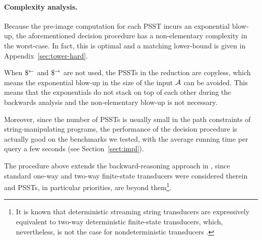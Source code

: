 \paragraph*{Complexity analysis.} Because the pre-image computation for each PSST incurs an exponential blow-up, the aforementioned decision procedure has a non-elementary complexity in the worst-case. In fact, this is optimal and a matching lower-bound is given in Appendix~\ref{sec:tower-hard}.

When $\$^{\leftarrow}$ and $\$^{\rightarrow}$ are not used, the PSSTs in the reduction are copyless, which means the exponential blow-up in the size of the input \FA{} $\mathcal{A}$ can be avoided. This means that the exponentials do not stack on top of each other during the backwards analysis and the non-elementary blow-up is not necessary.

Moreover, since the number of PSSTs is usually small in the path constraints of string-manipulating programs, the performance of the decision procedure is actually good on the benchmarks we tested, with the average running time per query a few seconds (see Section~\ref{sect:impl}).



\begin{remark}
The procedure above extends the backward-reasoning approach in \cite{CHL+19}, since standard one-way and two-way finite-state transducers were considered therein and PSSTs, in particular priorities, are beyond them\footnote{It is known that deterministic streaming string transducers are expressively equivalent to two-way deterministic finite-state transducers, which, nevertheless, is not the case for nondeterministic transducers \cite{AC10,AD11}.}.
\end{remark}




